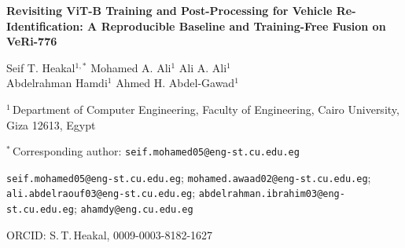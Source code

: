 \documentclass[10pt,a4paper]{article}
\begin{document}

\begin{center}
  {\LARGE\bfseries Revisiting ViT-B Training and Post-Processing for Vehicle
  Re-Identification: A Reproducible Baseline and Training-Free Fusion on
  VeRi-776\par}

  \vspace{1.4em}

  {\normalsize
   Seif T. Heakal$^{1,\ast}$ \quad
   Mohamed A. Ali$^{1}$ \quad
   Ali A. Ali$^{1}$ \\[4pt]
   Abdelrahman Hamdi$^{1}$ \quad
   Ahmed H. Abdel-Gawad$^{1}$\par}

  \vspace{0.9em}

  {\small $^{1}$\,Department of Computer Engineering, Faculty of Engineering,
   Cairo University, Giza 12613, Egypt\par}

  \vspace{0.5em}

  {\small $^{\ast}$\,Corresponding author:
   \texttt{seif.mohamed05@eng-st.cu.edu.eg}\par}

  \vspace{0.4em}

  {\footnotesize
    \texttt{seif.mohamed05@eng-st.cu.edu.eg};\;
    \texttt{mohamed.awaad02@eng-st.cu.edu.eg};\\
   \texttt{ali.abdelraouf03@eng-st.cu.edu.eg};\;
   \texttt{abdelrahman.ibrahim03@eng-st.cu.edu.eg};\;
   \texttt{ahamdy@eng.cu.edu.eg}\par}

  \vspace{0.4em}

  {\footnotesize ORCID: S.\,T.\,Heakal, 0009-0003-8182-1627\par}
\end{center}

\vspace{1.0em}



\vspace{0.8em}
\end{document}
